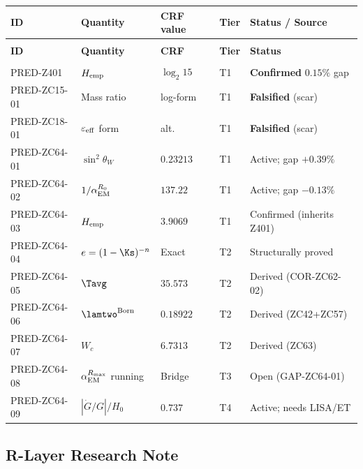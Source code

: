 \documentclass[12pt, a4paper]{article}
\renewcommand{\swsq}{\sin^2\!\theta_W}
\renewcommand{\aEM}{\alpha_{\rm EM}}
\begin{document}
{\small
\setlength{\LTpre}{4pt}\setlength{\LTpost}{4pt}
\renewcommand{\arraystretch}{1.30}
\begin{longtable}{>{\raggedright\arraybackslash}p{3.2cm}
                  >{\raggedright\arraybackslash}p{2.8cm}
                  >{\centering\arraybackslash}p{1.2cm}
                  >{\centering\arraybackslash}p{1.0cm}
                  >{\raggedright\arraybackslash}p{4.0cm}}
\toprule
\textbf{ID} & \textbf{Quantity} & \textbf{CRF value} & \textbf{Tier} & \textbf{Status / Source} \\
\midrule
\endfirsthead
\multicolumn{5}{l}{\small\textit{(continued)}}\\[4pt]
\toprule
\textbf{ID} & \textbf{Quantity} & \textbf{CRF} & \textbf{Tier} & \textbf{Status} \\
\midrule
\endhead
\midrule
\multicolumn{5}{r}{\small\textit{(continues)}}\\
\endfoot
\bottomrule
\endlastfoot
PRED-Z401 & $H_{\rm emp}$ & $\log_2 15$ & T1 & \textbf{Confirmed} $0.15\%$ gap \\[4pt]
PRED-ZC15-01 & Mass ratio & log-form & T1 & \textbf{Falsified} (scar) \\[4pt]
PRED-ZC18-01 & $\varepsilon_{\rm eff}$ form & alt. & T1 & \textbf{Falsified} (scar) \\[4pt]
\midrule
PRED-ZC64-01 & $\swsq$ & $0.23213$ & T1 & Active; gap $+0.39\%$ \\[4pt]
PRED-ZC64-02 & $1/\aEM^{R_0}$ & $137.22$ & T1 & Active; gap $-0.13\%$ \\[4pt]
PRED-ZC64-03 & $H_{\rm emp}$ & $3.9069$ & T1 & Confirmed (inherits Z401) \\[4pt]
PRED-ZC64-04 & $e = (1-\Ks)^{-n}$ & Exact & T2 & Structurally proved \\[4pt]
PRED-ZC64-05 & $\Tavg$ & $35.573$ & T2 & Derived (COR-ZC62-02) \\[4pt]
PRED-ZC64-06 & $\lamtwo^{\rm Born}$ & $0.18922$ & T2 & Derived (ZC42+ZC57) \\[4pt]
PRED-ZC64-07 & $W_c$ & $6.7313$ & T2 & Derived (ZC63) \\[4pt]
PRED-ZC64-08 & $\aEM^{R_{\max}}$ running & Bridge & T3 & Open (GAP-ZC64-01) \\[4pt]
PRED-ZC64-09 & $|\dot{G}/G|/H_0$ & $0.737$ & T4 & Active; needs LISA/ET \\[4pt]
\bottomrule
\end{longtable}
}

\subsection{R-Layer Research Note}
\label{sec:rlayer}
\end{document}
